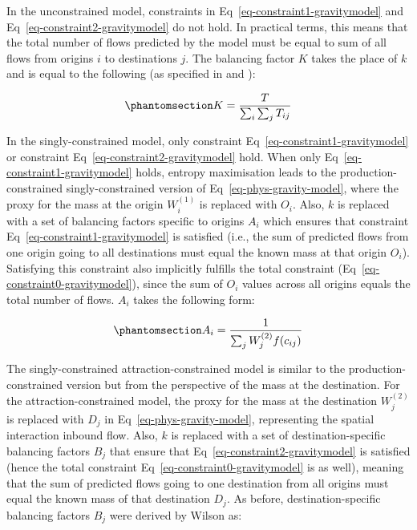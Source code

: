 \documentclass[
  10pt,
  letterpaper,
]{article}
\begin{document}
In the unconstrained model, constraints in
Eq~\ref{eq-constraint1-gravitymodel} and
Eq~\ref{eq-constraint2-gravitymodel} do not hold. In practical terms,
this means that the total number of flows predicted by the model must be
equal to sum of all flows from origins \(i\) to destinations \(j\). The
balancing factor \(K\) takes the place of \(k\) and is equal to the
following (as specified in \citep{cliff_evaluating_1974} and
\citep{fotheringham_spatial_1984}):

\begin{equation}\phantomsection\label{eq-total-flow-balancing-factor}{
K=\frac{T}{\sum_i\sum_j T_{ij}}
}\end{equation}

In the singly-constrained model, only constraint
Eq~\ref{eq-constraint1-gravitymodel} or constraint
Eq~\ref{eq-constraint2-gravitymodel} hold. When only
Eq~\ref{eq-constraint1-gravitymodel} holds, entropy maximisation leads
to the production-constrained singly-constrained version of
Eq~\ref{eq-phys-gravity-model}, where the proxy for the mass at the
origin \(W_i^{(1)}\) is replaced with \(O_i\). Also, \(k\) is replaced
with a set of balancing factors specific to origins \(A_i\) which
ensures that constraint Eq~\ref{eq-constraint1-gravitymodel} is
satisfied (i.e., the sum of predicted flows from one origin going to all
destinations must equal the known mass at that origin \(O_i\)).
Satisfying this constraint also implicitly fulfills the total constraint
(Eq~\ref{eq-constraint0-gravitymodel}), since the sum of \(O_i\) values
across all origins equals the total number of flows. \(A_i\) takes the
following form:

\begin{equation}\phantomsection\label{eq-production-constrained-balancing-factor}{
A_i = \frac{1}{\sum_j W_j^{(2)} f(c_{ij})}
}\end{equation}

The singly-constrained attraction-constrained model is similar to the
production-constrained version but from the perspective of the mass at
the destination. For the attraction-constrained model, the proxy for the
mass at the destination \(W_j^{(2)}\) is replaced with \(D_j\) in
Eq~\ref{eq-phys-gravity-model}, representing the spatial interaction
inbound flow. Also, \(k\) is replaced with a set of destination-specific
balancing factors \(B_j\) that ensure that
Eq~\ref{eq-constraint2-gravitymodel} is satisfied (hence the total
constraint Eq~\ref{eq-constraint0-gravitymodel} is as well), meaning
that the sum of predicted flows going to one destination from all
origins must equal the known mass of that destination \(D_j\). As
before, destination-specific balancing factors \(B_j\) were derived by
Wilson as:
\end{document}
